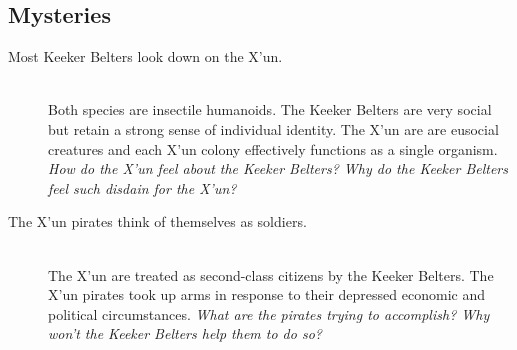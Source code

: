 \documentclass[11pt, a5paper, parskip=half-, DIV=12]{scrartcl}
\begin{document}
\subsection*{Mysteries}
\begin{description}
	\item[Most Keeker Belters look down on the X'un.] \phantom{a} \\ Both species are insectile humanoids. The Keeker Belters are very social but retain a strong sense of individual identity. The X'un are are eusocial creatures and each X'un colony effectively functions as a single organism. \textit{How do the X'un feel about the Keeker Belters? Why do the Keeker Belters feel such disdain for the X'un? }
	\item[The X'un pirates think of themselves as soldiers.] \phantom{a} \\ The X'un are treated as second-class citizens by the Keeker Belters. The X'un pirates took up arms in response to their depressed economic and political circumstances. \textit{What are the pirates trying to accomplish? Why won't the Keeker Belters help them to do so?}
\end{description}

\newpage



\newpage

\thispagestyle{empty}


\ClearShipoutPicture
{}

\phantom{a}
\end{document}
